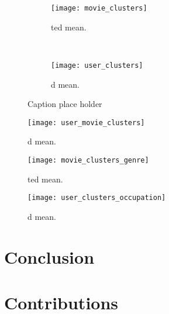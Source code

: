\documentclass[bj, preprint]{imsart}
\begin{document}
\begin{figure*}[t!]
    \centering
    \begin{subfigure}[t]{0.5\textwidth}
	\centering
	\texttt{[image: movie\_clusters]}
	\caption{ted mean.\label{fig:explore.cluster.movies}}
    \end{subfigure}%
    ~ 
    \begin{subfigure}[t]{0.5\textwidth}
	\centering
	\texttt{[image: user\_clusters]}
	\caption{d mean.\label{fig:explore.cluster.users}}
    \end{subfigure}
    \caption{Caption place holder}
\end{figure*}



\begin{figure}[t]
	\centering
	\texttt{[image: user\_movie\_clusters]}
	\caption{d mean.\label{fig:explore.cluster.pairs}}
\end{figure}

\begin{figure}[t]
	\centering
	\texttt{[image: movie\_clusters\_genre]}
	\caption{ted mean.\label{fig:explore.cluster.genre}}
\end{figure}


\begin{figure}[t]
	\centering
	\texttt{[image: user\_clusters\_occupation]}
	\caption{d mean.\label{fig:explore.cluster.occupation}}
\end{figure}
\section{Conclusion}\label{sec:conc}



\clearpage
\newpage

{}


\clearpage
\newpage
\appendix 

\section{Contributions}\label{sec:contrib}
\end{document}
